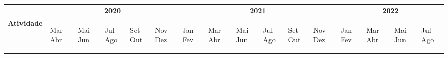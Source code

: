 \begin{table}[!ht]%
\centering
\fontsize{8pt}{8pt}\selectfont
\addtolength{\tabcolsep}{-4pt} %
\label{tab:cronograma}
\begin{tabular}{|l|l|l|l|l|l|l|l|l|l|l|l|l|l|l|l|} 
	\hline
	& \multicolumn{5}{c|}{\textbf{2020}}                                                                                                                                                                    & \multicolumn{6}{c|}{\textbf{2021}}                                                                                                                                                                                                            & \multicolumn{4}{c|}{\textbf{2022}}                                                                                                                              \\ 
	\cline{2-16}
	\textbf{\textbf{Atividade}}              & \begin{sideways}Mar-Abr\end{sideways} & \begin{sideways}Mai-Jun\end{sideways} & \begin{sideways}Jul-Ago\end{sideways} & \begin{sideways}Set-Out\end{sideways} & \begin{sideways}Nov-Dez\end{sideways} & \begin{sideways}Jan-Fev\end{sideways} & \begin{sideways}Mar-Abr\end{sideways} & \begin{sideways}Mai-Jun\end{sideways} & \begin{sideways}Jul-Ago\end{sideways} & \begin{sideways}Set-Out\end{sideways} & \begin{sideways}Nov-Dez\end{sideways} & \begin{sideways}Jan-Fev\end{sideways} & \begin{sideways}Mar-Abr\end{sideways} & \begin{sideways}Mai-Jun\end{sideways} & \begin{sideways}Jul- Ago\end{sideways}  \\ 

\end{tabular}
\end{table}
